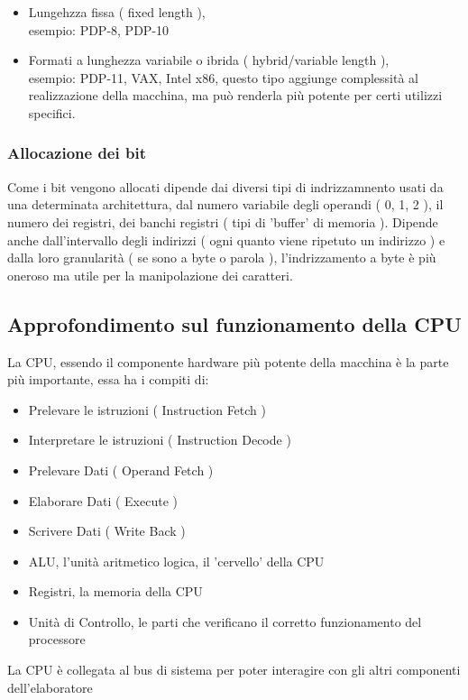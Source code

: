 \documentclass[arch.tex]{subfiles}
\begin{document}
\begin{itemize}
	\item Lungehzza fissa ( fixed length ),\\
		esempio: PDP-8, PDP-10
	\item Formati a lunghezza variabile o ibrida ( hybrid/variable length ),\\
		esempio: PDP-11, VAX, Intel x86, questo tipo aggiunge complessità
		al realizzazione della macchina, ma può renderla più potente per certi 
		utilizzi specifici.
\end{itemize}

\subsubsection{Allocazione dei bit}
Come i bit vengono allocati dipende dai diversi tipi di indrizzamnento usati da una determinata
architettura, dal numero variabile degli operandi ( 0, 1, 2 ),
il numero dei registri, dei banchi registri ( tipi di 'buffer' di memoria ).
Dipende anche dall'intervallo degli indirizzi ( ogni quanto viene ripetuto un indirizzo ) e dalla
loro granularità ( se sono a byte o parola ), l'indrizzamento a byte è più oneroso
ma utile per la manipolazione dei caratteri.

\subsection{Approfondimento sul funzionamento della CPU}%
\label{sub:approfondimento_sul_funzionamento_della_cpu}

La CPU, essendo il componente hardware più potente della macchina è la parte più importante,
essa ha i compiti di:

\begin{itemize}
	\item Prelevare le istruzioni ( Instruction Fetch )
	\item Interpretare le istruzioni ( Instruction Decode ) 
	\item Prelevare Dati ( Operand Fetch ) 
	\item Elaborare Dati ( Execute ) 
	\item Scrivere Dati ( Write Back ) 
\end{itemize}

%
\label{ppar:Componenti principali CPU}


\begin{itemize}
	\item ALU, l'unità aritmetico logica, il 'cervello' della CPU
	\item Registri, la memoria della CPU
	\item Unità di Controllo, le parti che verificano il corretto funzionamento del
		processore
\end{itemize}
La CPU è collegata al bus di sistema per poter interagire con gli altri componenti 
dell'elaboratore
\end{document}
